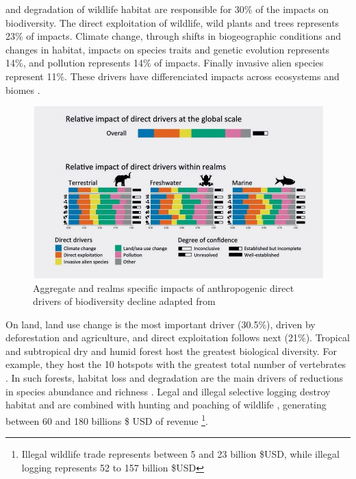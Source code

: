 %
and degradation of wildlife habitat are responsible for 30\% of the impacts on biodiversity. The direct exploitation of wildlife, wild plants and trees represents 23\% of impacts. Climate change, through shifts in biogeographic conditions and changes in habitat, impacts on species traits and genetic evolution represents 14\%, and pollution represents 14\% of impacts. Finally invasive alien species represent 11\%. These drivers have differenciated impacts across ecosystems and biomes \citep{ipbes_2022_6417333}. 

\begin{figure}[h]
	\centering
	\includegraphics[width = .95 \textwidth]{figures/intro/intro_impactsfin.jpg}
	\caption{Aggregate and realms specific impacts of anthropogenic direct drivers of biodiversity decline adapted from \cite{ipbes_2022_6417333}}
	\label{fig:intro_impacts}
\end{figure}

On land, land use change is the most important driver (30.5\%), driven by deforestation and agriculture, and direct exploitation follows next (21\%). Tropical and subtropical dry and humid forest host the greatest biological diversity. For example, they host the 10 hotspots with the greatest total number of vertebrates \citep{mittermeier_global_2011}. In such forests, habitat loss and degradation are the main drivers of reductions in species abundance and richness \citep{newbold_global_2014}. Legal and illegal selective logging destroy habitat \citep{hoare2022establishing,  bousfield_2023_large} and are combined with hunting and poaching of wildlife \citep{gallego_2020_combined}, generating between 60 and 180 billions  \$ USD of revenue \citep{gfi_2017}\footnote{Illegal wildlife trade represents between 5 and 23 billion \$USD, while illegal logging represents 52 to 157 billion \$USD}. 

